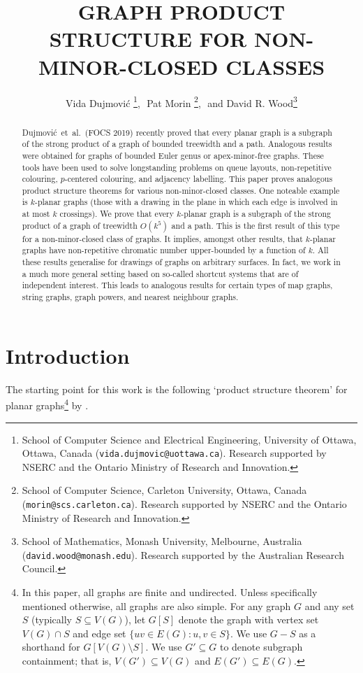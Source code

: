 \documentclass{patmorin}
\title{\MakeUppercase{Graph Product Structure for Non-Minor-Closed Classes}}
\author{Vida Dujmovi\'c%
        \thanks{School of Computer Science and Electrical Engineering,
                University of Ottawa, Ottawa, Canada (\texttt{vida.dujmovic@uottawa.ca}).
                Research supported by NSERC and the Ontario Ministry of Research and Innovation.},\,\,
        Pat Morin%
        \thanks{School of Computer Science, Carleton University, Ottawa, Canada (\texttt{morin@scs.carleton.ca}). Research  supported by NSERC and the Ontario Ministry of Research and Innovation.},\,\, and
        David R. Wood\thanks{School of Mathematics, Monash University, Melbourne, Australia (\texttt{david.wood@monash.edu}). Research supported by the Australian Research Council.}
}
\begin{document}
\begin{titlepage}
\maketitle

\begin{abstract}
Dujmovi\'c~et~al.~(FOCS 2019) recently proved that every planar graph is a subgraph of the strong product of a graph of bounded treewidth and a path. Analogous results were obtained for graphs of bounded Euler genus or apex-minor-free graphs. These tools have been used to solve longstanding problems on queue layouts, non-repetitive colouring, $p$-centered colouring, and adjacency labelling. This paper proves analogous product structure theorems for various non-minor-closed classes. One noteable example is $k$-planar graphs (those with a drawing in the plane in which each edge is involved in at most $k$ crossings). We prove that every $k$-planar graph is a subgraph of the strong product of a graph of treewidth $O(k^5)$ and a path. This is the first result of this type for a non-minor-closed class of graphs. It implies, amongst other results, that $k$-planar graphs have non-repetitive chromatic number upper-bounded by a function of $k$. All these results generalise for drawings of graphs on arbitrary surfaces. In fact, we work in a much more general setting based on so-called shortcut systems that are of independent interest. This leads to analogous results for certain types of map graphs, string graphs, graph powers, and nearest neighbour graphs. 
\end{abstract}
\end{titlepage}
\tableofcontents
\newpage

\section{Introduction}
\label{Introduction}

The starting point for this work is the following `product structure theorem' for planar graphs\footnote{In this paper, all graphs are finite and undirected. Unless specifically mentioned otherwise, all graphs are also simple. For any graph $G$ and any set $S$ (typically $S\subseteq V(G)$), let $G[S]$  denote the graph with vertex set $V(G)\cap S$ and edge set $\{uv\in E(G) : u,v\in S\}$.  We use $G-S$ as a shorthand for $G[V(G)\setminus S]$. We use $G'\subseteq G$ to denote subgraph containment; that is, $V(G')\subseteq V(G)$ and $E(G')\subseteq E(G)$.} by \citet{dujmovic.joret.ea:planar}.
\end{document}
